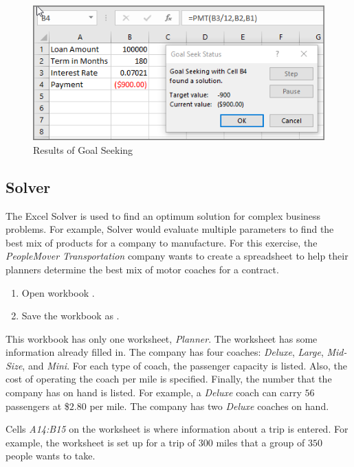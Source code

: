\begin{figure}[H]
	\centering
	\includegraphics[width=\maxwidth{.95\linewidth}]{gfx/ch08_fig61}
	\caption{Results of Goal Seeking}
	\label{08:fig61}
\end{figure}

\subsection{Solver}

The Excel Solver is used to find an optimum solution for complex business problems. For example, Solver would evaluate multiple parameters to find the best mix of products for a company to manufacture. For this exercise, the \textit{PeopleMover Transportation} company wants to create a spreadsheet to help their planners determine the best mix of motor coaches for a contract.

\begin{enumbox}
	\begin{enumerate}
		\item Open workbook .
		\item Save the workbook as .
	\end{enumerate}
\end{enumbox}

This workbook has only one worksheet, \textit{Planner}. The worksheet has some information already filled in. The company has four coaches: \textit{Deluxe}, \textit{Large}, \textit{Mid-Size}, and \textit{Mini}. For each type of coach, the passenger capacity is listed. Also, the cost of operating the coach per mile is specified. Finally, the number that the company has on hand is listed. For example, a \textit{Deluxe} coach can carry $ 56 $ passengers at \$$ 2.80 $ per mile. The company has two \textit{Deluxe} coaches on hand.

Cells \textit{A14:B15} on the worksheet is where information about a trip is entered. For example, the worksheet is set up for a trip of $ 300 $ miles that a group of $ 350 $ people wants to take.

